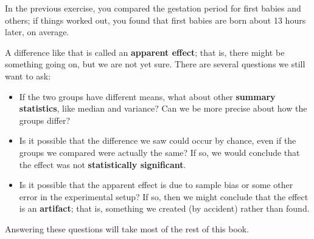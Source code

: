 \documentclass[12pt]{book}
\begin{document}
In the previous exercise, you compared the gestation period for first
babies and others; if things worked out, you found that first
babies are born about 13 hours later, on average.


A difference like that is called an {\bf apparent effect}; that is,
there might be something going on, but we are not yet sure.  There are
several questions we still want to ask:

\begin{itemize}

\item If the two groups have different means, what about other {\bf
  summary statistics}, like median and variance?  Can we be more
  precise about how the groups differ?


\item Is it possible that the difference we saw could occur by chance,
  even if the groups we compared were actually the same?  If so,
  we would conclude that the effect was not {\bf statistically
    significant}.



\item Is it possible that the apparent effect is due to sample bias or
  some other error in the experimental setup?  If so, then we might
  conclude that the effect is an {\bf artifact}; that is, something we
  created (by accident) rather than found. 


\end{itemize}

Answering these questions will take most of the rest of this book.
\end{document}
